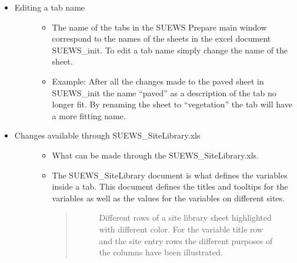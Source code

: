 \documentclass[letterpaper,10pt,english]{sphinxmanual}
\begin{document}
\begin{itemize}
\begin{description}
\begin{itemize}
\end{itemize}

\end{description}

\item {} \begin{description}
\item[{Editing a tab name}] \leavevmode\begin{itemize}
\item {} 
The name of the tabs in the SUEWS Prepare main window correspond to the names of the sheets in the excel document SUEWS\_init. To edit a tab name simply change the name of the sheet.

\item {} 
Example: After all the changes made to the paved sheet in SUEWS\_init the name “paved” as a description of the tab no longer fit. By renaming the sheet to “vegetation” the tab will have a more fitting name.  

\end{itemize}

\end{description}

\item {} \begin{description}
\item[{Changes available through SUEWS\_SiteLibrary.xls}] \leavevmode\begin{itemize}
\item {} 
What can be made through the SUEWS\_SiteLibrary.xls.

\item {} 
The SUEWS\_SiteLibrary document is what defines the variables inside a tab. This document defines the titles and tooltips for the variables as well as the values for the variables on different sites.
\begin{quote}

\begin{figure}[htbp]
\centering
\capstart

\noindent{}
\caption{Different rows of a site library sheet highlighted with different color. For the variable title row and the site entry rows the different purposes of the columns have been illustrated.}\label{\detokenize{DevelopmentGuidelines:id7}}\end{figure}
\end{quote}

\end{itemize}


\end{description}
\end{itemize}
\end{document}
